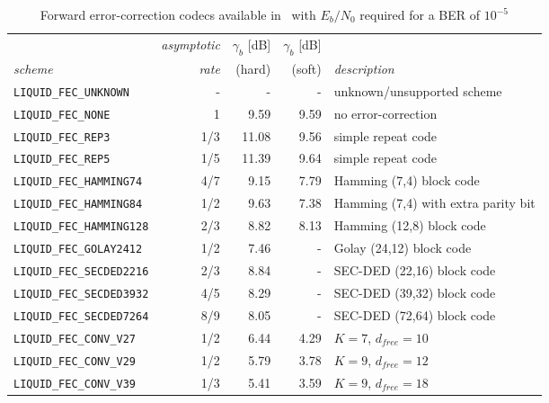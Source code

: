 \begin{table*}
\caption{Forward error-correction codecs available in \liquid\
         with $E_b/N_0$ required for a BER of $10^{-5}$}
\label{tab:fec:codecs}
\centering
{\small
\begin{tabular*}{0.95\textwidth}{l@{\extracolsep{\fill}}rrrl}
\toprule
             & {\it asymptotic} & {\it $\gamma_b$} [dB] & {\it $\gamma_b$} [dB] & \\
{\it scheme} & {\it rate}       & (hard)                & (soft)                & {\it description}\\\otoprule
%
{\tt LIQUID\_FEC\_UNKNOWN}      & -       &     - &     - & unknown/unsupported scheme\\
{\tt LIQUID\_FEC\_NONE}         & 1       &  9.59 &  9.59 & no error-correction\\
{\tt LIQUID\_FEC\_REP3}         & 1/3     & 11.08 &  9.56 & simple repeat code\\
{\tt LIQUID\_FEC\_REP5}         & 1/5     & 11.39 &  9.64 & simple repeat code\\
{\tt LIQUID\_FEC\_HAMMING74}    & 4/7     &  9.15 &  7.79 & Hamming (7,4) block code\\
{\tt LIQUID\_FEC\_HAMMING84}    & 1/2     &  9.63 &  7.38 & Hamming (7,4) with extra parity bit\\
{\tt LIQUID\_FEC\_HAMMING128}   & 2/3     &  8.82 &  8.13 & Hamming (12,8) block code\\
{\tt LIQUID\_FEC\_GOLAY2412}    & 1/2     &  7.46 &     - & Golay (24,12) block code\\
{\tt LIQUID\_FEC\_SECDED2216}   & 2/3     &  8.84 &     - & SEC-DED (22,16) block code\\
{\tt LIQUID\_FEC\_SECDED3932}   & 4/5     &  8.29 &     - & SEC-DED (39,32) block code\\
{\tt LIQUID\_FEC\_SECDED7264}   & 8/9     &  8.05 &     - & SEC-DED (72,64) block code\\\midrule
%
{\tt LIQUID\_FEC\_CONV\_V27}    & 1/2     &  6.44 & 4.29 & $K=7$, $d_{free}=10$\\
{\tt LIQUID\_FEC\_CONV\_V29}    & 1/2     &  5.79 & 3.78 & $K=9$, $d_{free}=12$\\
{\tt LIQUID\_FEC\_CONV\_V39}    & 1/3     &  5.41 & 3.59 & $K=9$, $d_{free}=18$\\

\end{tabular*}}
\end{table*}

